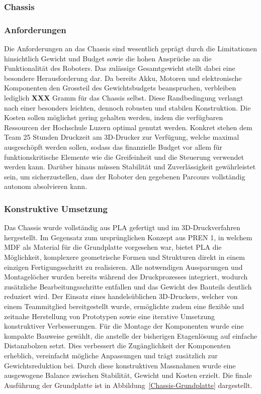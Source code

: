 \documentclass[main.tex]{subfiles} %
\begin{document}

\subsubsection{Chassis}

\subsubsection*{Anforderungen}

Die Anforderungen an das Chassis sind wesentlich geprägt durch die Limitationen 
hinsichtlich Gewicht und Budget sowie die hohen Ansprüche an die Funktionalität 
des Roboters. Das zulässige Gesamtgewicht stellt dabei eine besondere 
Herausforderung dar. Da bereits Akku, Motoren und elektronische Komponenten 
den Grossteil des Gewichtsbudgets beanspruchen, verbleiben lediglich \textbf{XXX} 
Gramm für das Chassis selbst. Diese Randbedingung verlangt nach einer besonders 
leichten, dennoch robusten und stabilen Konstruktion. Die Kosten sollen möglichst 
gering gehalten werden, indem die verfügbaren Ressourcen der Hochschule Luzern 
optimal genutzt werden. Konkret stehen dem Team 25 Stunden Druckzeit am 3D-Drucker 
zur Verfügung, welche maximal ausgeschöpft werden sollen, sodass das finanzielle 
Budget vor allem für funktionskritische Elemente wie die Greifeinheit 
und die Steuerung verwendet werden kann. Darüber hinaus müssen Stabilität und 
Zuverlässigkeit gewährleistet sein, um sicherzustellen, dass der Roboter den 
gegebenen Parcours vollständig autonom absolvieren kann.

\newpage

\subsubsection*{Konstruktive Umsetzung}

Das Chassis wurde vollständig aus PLA gefertigt und im 3D-Druckverfahren 
hergestellt. Im Gegensatz zum ursprünglichen Konzept aus PREN 1, in welchem 
MDF als Material für die Grundplatte vorgesehen war, bietet PLA die 
Möglichkeit, komplexere geometrische Formen und Strukturen direkt in einem 
einzigen Fertigungsschritt zu realisieren. Alle notwendigen Aussparungen 
und Montagelöcher wurden bereits während des Druckprozesses integriert, 
wodurch zusätzliche Bearbeitungsschritte entfallen und das Gewicht des 
Bauteils deutlich reduziert wird. Der Einsatz eines handelsüblichen 
3D-Druckers, welcher von einem Teammitglied bereitgestellt wurde, 
ermöglichte zudem eine flexible und zeitnahe Herstellung von Prototypen 
sowie eine iterative Umsetzung konstruktiver Verbesserungen. Für die Montage 
der Komponenten wurde eine kompakte Bauweise gewählt, die anstelle der 
bisherigen Etagenlösung auf einfache Distanzbolzen setzt. Dies verbessert die 
Zugänglichkeit der Komponenten erheblich, vereinfacht mögliche Anpassungen 
und trägt zusätzlich zur Gewichtsreduktion bei. Durch diese konstruktiven 
Massnahmen wurde eine ausgewogene Balance zwischen Stabilität, Gewicht und 
Kosten erzielt. Die finale Ausführung der Grundplatte ist in 
Abbildung~\ref{Chassis-Grundplatte} dargestellt.
\end{document}
